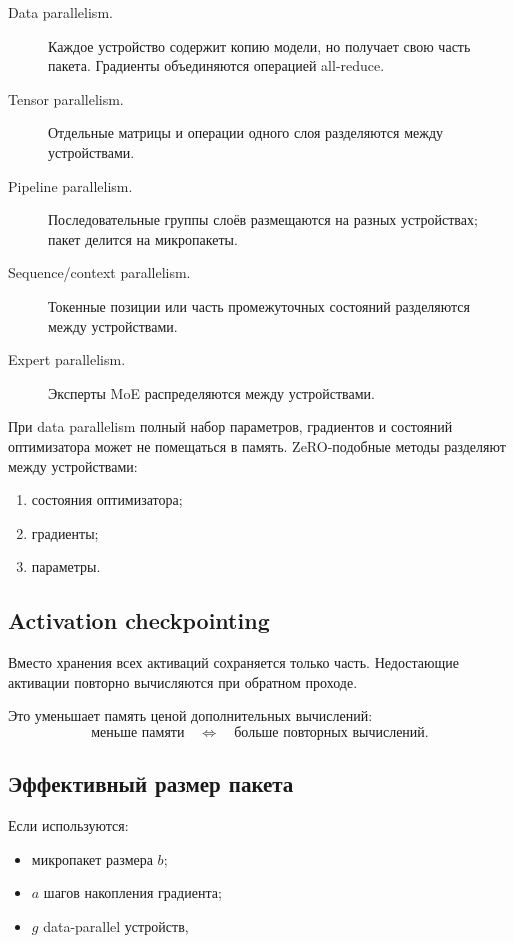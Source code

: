 \documentclass[12pt,a4paper]{article}
\newcommand{\1}{\mathbf{1}}
\theoremstyle{definition}
\theoremstyle{remark}
\begin{document}
\begin{description}
    \item[Data parallelism.] Каждое устройство содержит копию модели,
    но получает свою часть пакета. Градиенты объединяются операцией
    all-reduce.

    \item[Tensor parallelism.] Отдельные матрицы и операции одного слоя
    разделяются между устройствами.

    \item[Pipeline parallelism.] Последовательные группы слоёв размещаются
    на разных устройствах; пакет делится на микропакеты.

    \item[Sequence/context parallelism.] Токенные позиции или часть
    промежуточных состояний разделяются между устройствами.

    \item[Expert parallelism.] Эксперты MoE распределяются между
    устройствами.
\end{description}

При data parallelism полный набор параметров, градиентов и состояний
оптимизатора может не помещаться в память. ZeRO-подобные методы
разделяют между устройствами:

\begin{enumerate}
    \item состояния оптимизатора;
    \item градиенты;
    \item параметры.
\end{enumerate}

\subsection{Activation checkpointing}

Вместо хранения всех активаций сохраняется только часть. Недостающие
активации повторно вычисляются при обратном проходе.

Это уменьшает память ценой дополнительных вычислений:
\[
\text{меньше памяти}
\quad\Longleftrightarrow\quad
\text{больше повторных вычислений}.
\]

\subsection{Эффективный размер пакета}

Если используются:

\begin{itemize}
    \item микропакет размера $b$;
    \item $a$ шагов накопления градиента;
    \item $g$ data-parallel устройств,
\end{itemize}
\end{document}
